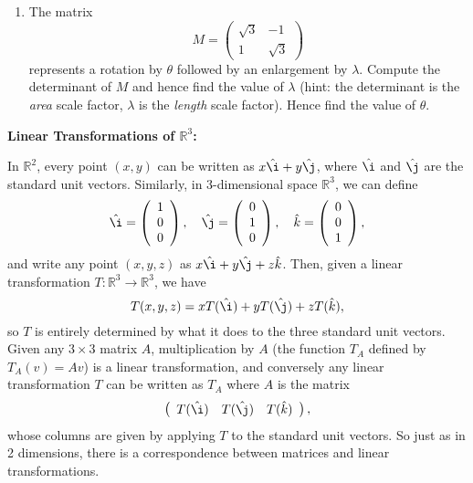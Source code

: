\documentclass{article}
\newcommand{\ihat}{\hat\i}
\newcommand{\jhat}{\hat\j}
\newcommand{\khat}{\hat{k}}
\begin{document}
\begin{enumerate}
	\item The matrix
		\[M=\left(\begin{array}{cc}\sqrt{3}&-1\\1&\sqrt{3}\end{array}\right)\]
		represents a rotation by $\theta$ followed by an enlargement by $\lambda$. Compute the determinant of $M$ and hence find the value of $\lambda$ (hint: the determinant is the \textit{area} scale factor, $\lambda$ is the \textit{length} scale factor). Hence find the value of $\theta$.
\end{enumerate}


\clearpage



\textbf{Linear Transformations of $\mathbb{R}^3$:}\bigskip

In $\mathbb{R}^2$, every point $(x,y)$ can be written as $x\ihat+y\jhat$, where $\ihat$ and $\jhat$ are the standard unit vectors. Similarly, in 3-dimensional space $\mathbb{R}^3$, we can define
\[\ihat=\left(\begin{array}{c}1\\0\\0\end{array}\right),\quad \jhat=\left(\begin{array}{c}0\\1\\0\end{array}\right),\quad \khat=\left(\begin{array}{c}0\\0\\1\end{array}\right),\]
and write any point $(x,y,z)$ as $x\ihat+y\jhat+z\khat$. Then, given a linear transformation $T\colon\mathbb{R}^3\to\mathbb{R}^3$, we have
\[T(x,y,z)=xT(\ihat)+yT(\jhat)+zT(\khat),\]
so $T$ is entirely determined by what it does to the three standard unit vectors. Given any $3\times 3$ matrix $A$, multiplication by $A$ (the function $T_A$ defined by $T_A(v)=Av$) is a linear transformation, and conversely any linear transformation $T$ can be written as $T_A$ where $A$ is the matrix
\[\left(\begin{array}{ccc}T(\ihat)&T(\jhat)&T(\khat)\end{array}\right),\]
whose columns are given by applying $T$ to the standard unit vectors. So just as in 2 dimensions, there is a correspondence between matrices and linear transformations.
\end{document}
